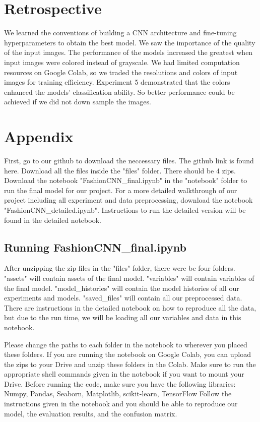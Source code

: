 \documentclass[twoside,twocolumn,9pt]{article}
\begin{document}
\section{Retrospective}
We learned the conventions of building a CNN architecture and fine-tuning hyperparameters to obtain the best model. We saw the importance of the quality of the input images. The performance of the models increased the greatest when input images were colored instead of grayscale. We had limited computation resources on Google Colab, so we traded the resolutions and colors of input images for training efficiency. Experiment 5 demonstrated that the colors enhanced the models' classification ability. So better performance could be achieved if we did not down sample the images.

\section{Appendix}

First, go to our github to download the neccessary files. The github link is found here\cite{github}. Download all the files inside the "files" folder. There should be 4 zips. Download the notebook  "FashionCNN\_final.ipynb" in the "notebook" folder to run the final model for our project. For a more detailed walkthrough of our project including all experiment and data preprocessing, download the notebook "FashionCNN\_detailed.ipynb". Instructions to run the detailed version will be found in the detailed notebook.

\subsection{Running FashionCNN\_final.ipynb}
After unzipping the zip files in the "files" folder, there were be four folders. "assets" will contain assets of the final model. "variables" will contain variables of the final model. "model\_histories" will contain the model histories of all our experiments and models. "saved\_files" will contain all our preprocessed data. There are instructions in the detailed notebook on how to reproduce all the data, but due to the run time, we will be loading all our variables and data in this notebook. 

\noindent Please change the paths to each folder in the notebook to wherever you placed these folders. If you are running the notebook on Google Colab, you can upload the zips to your Drive and unzip these folders in the Colab. Make sure to run the appropriate shell commands given in the notebook if you want to mount your Drive. Before running the code, make sure you have the following libraries: Numpy, Pandas, Seaborn, Matplotlib, scikit-learn, TensorFlow
Follow the instructions given in the notebook and you should be able to reproduce our model, the evaluation results, and the confusion matrix. 
\end{document}
